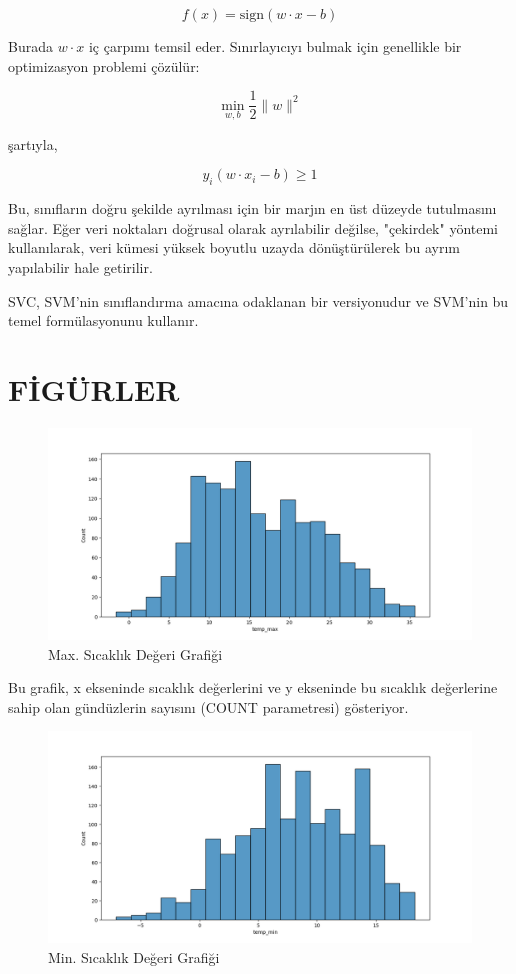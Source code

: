 \documentclass[twocolumn]{article}
\begin{document}
	\[ f(x) = \text{sign}(w \cdot x - b) \]
	
	Burada $w \cdot x$ iç çarpımı temsil eder. Sınırlayıcıyı bulmak için genellikle bir optimizasyon problemi çözülür:
	
	\[ \min_{w, b} \frac{1}{2} \|w\|^2 \]
	
	şartıyla,
	
	\[ y_i(w \cdot x_i - b) \geq 1 \]
	
	Bu, sınıfların doğru şekilde ayrılması için bir marjın en üst düzeyde tutulmasını sağlar. Eğer veri noktaları doğrusal olarak ayrılabilir değilse, "çekirdek" yöntemi kullanılarak, veri kümesi yüksek boyutlu uzayda dönüştürülerek bu ayrım yapılabilir hale getirilir.
	
	SVC, SVM'nin sınıflandırma amacına odaklanan bir versiyonudur ve SVM'nin bu temel formülasyonunu kullanır.
	
	\section{FİGÜRLER}
	
	\begin{figure}[h]
		\centering
		\includegraphics[width=\linewidth]{"Figures/Figure1.png"}
		\caption{Max. Sıcaklık Değeri Grafiği}
		\label{fig:ornek}
	\end{figure}
	
	Bu grafik, x ekseninde sıcaklık değerlerini ve y ekseninde bu sıcaklık değerlerine sahip olan gündüzlerin sayısını (COUNT parametresi) gösteriyor.
	
	\begin{figure}[h]
		\centering
		\includegraphics[width=\linewidth]{"Figures/Figure2.png"}
		\caption{Min. Sıcaklık Değeri Grafiği}
		\label{fig:ornek}
	\end{figure}
	
\end{document}
